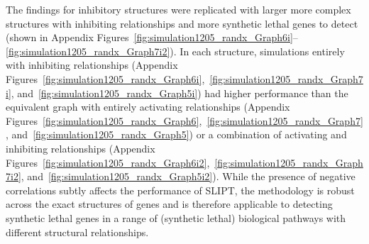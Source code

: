 
The findings for inhibitory  structures were replicated with larger more complex  structures with inhibiting relationships and more \gls{synthetic lethal} genes to detect (shown in Appendix Figures~\ref{fig:simulation1205_randx_Graph6i}\nobreakdash--\ref{fig:simulation1205_randx_Graph7i2}). In each  structure, simulations entirely with inhibiting relationships (Appendix Figures~\ref{fig:simulation1205_randx_Graph6i},~\ref{fig:simulation1205_randx_Graph7i}, and~\ref{fig:simulation1205_randx_Graph5i}) had higher performance than the equivalent graph with entirely activating relationships (Appendix Figures~\ref{fig:simulation1205_randx_Graph6},~\ref{fig:simulation1205_randx_Graph7}, and~\ref{fig:simulation1205_randx_Graph5}) or a combination of activating and inhibiting relationships (Appendix Figures~\ref{fig:simulation1205_randx_Graph6i2},~\ref{fig:simulation1205_randx_Graph7i2}, and~\ref{fig:simulation1205_randx_Graph5i2}). 
While the presence of negative correlations subtly affects the performance of \gls{SLIPT}, the methodology is robust across the exact structures of genes and is therefore applicable to detecting \gls{synthetic lethal} genes in a range of (synthetic lethal) biological pathways with different structural relationships.



